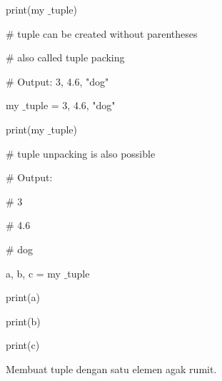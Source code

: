 \documentclass[a4paper,12pt]{report}
\begin{document}
\noindent 
{\fontsize{14pt}{14pt}\selectfont print(my $  \_  $tuple) \\} \par
\vspace{14pt}
\noindent 
{\fontsize{14pt}{14pt}\selectfont  $  \#  $ tuple can be created without parentheses \\} \par
\noindent 
{\fontsize{14pt}{14pt}\selectfont  $  \#  $ also called tuple packing \\} \par
\noindent 
{\fontsize{14pt}{14pt}\selectfont  $  \#  $ Output: 3, 4.6, "dog" \\} \par
\vspace{14pt}
\noindent 
{\fontsize{14pt}{14pt}\selectfont my $  \_  $tuple = 3, 4.6, "dog" \\} \par
\noindent 
{\fontsize{14pt}{14pt}\selectfont print(my $  \_  $tuple) \\} \par
\vspace{14pt}
\noindent 
{\fontsize{14pt}{14pt}\selectfont  $  \#  $ tuple unpacking is also possible \\} \par
\noindent 
{\fontsize{14pt}{14pt}\selectfont  $  \#  $ Output: \\} \par
\noindent 
{\fontsize{14pt}{14pt}\selectfont  $  \#  $ 3 \\} \par
\noindent 
{\fontsize{14pt}{14pt}\selectfont  $  \#  $ 4.6 \\} \par
\noindent 
{\fontsize{14pt}{14pt}\selectfont  $  \#  $ dog \\} \par
\noindent 
{\fontsize{14pt}{14pt}\selectfont a, b, c = my $  \_  $tuple \\} \par
\noindent 
{\fontsize{14pt}{14pt}\selectfont print(a) \\} \par
\noindent 
{\fontsize{14pt}{14pt}\selectfont print(b) \\} \par
\noindent 
{\fontsize{14pt}{14pt}\selectfont print(c) \\} \par
\vspace{14pt}
\noindent 
{\fontsize{14pt}{14pt}\selectfont Membuat tuple dengan satu elemen agak rumit. \\} \par
\end{document}
